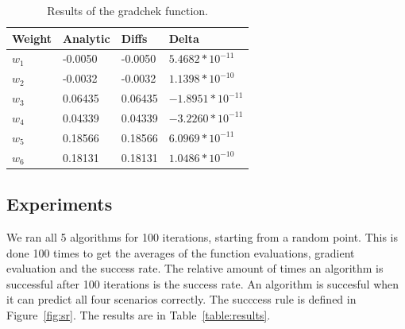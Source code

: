\documentclass{article}
\begin{document}

	

\begin{table}[H]
	\centering
	\begin{tabular}{| l | l | l | l |}
		\hline
		Weight & Analytic & Diffs & Delta \\ \hline
$w_1$ & -0.0050 & -0.0050 & $5.4682*10^{-11}$ \\ \hline
$w_2$ & -0.0032 & -0.0032 & $1.1398*10^{-10}$ \\ \hline
$w_3$ & 0.06435 & 0.06435 & $-1.8951*10^{-11}$ \\ \hline
$w_4$ & 0.04339 & 0.04339 & $-3.2260*10^{-11}$ \\ \hline
$w_5$ & 0.18566 & 0.18566 & $6.0969*10^{-11}$ \\ \hline
$w_6$ & 0.18131 & 0.18131 & $1.0486*10^{-10}$ \\ \hline
	\end{tabular}
	\caption{Results of the gradchek function.}
	\label{table:gradchek}
\end{table}

\subsection{Experiments}
We ran all 5 algorithms for 100 iterations, starting from a random point. This is done 100 times to get the averages of the function evaluations, gradient evaluation and the success rate. The relative amount of times an algorithm is successful after 100 iterations is the success rate. An algorithm is succesful when it can predict all four scenarios correctly. The succcess rule is defined in Figure~\ref{fig:sr}. The results are in Table~\ref{table:results}. 
\end{document}

